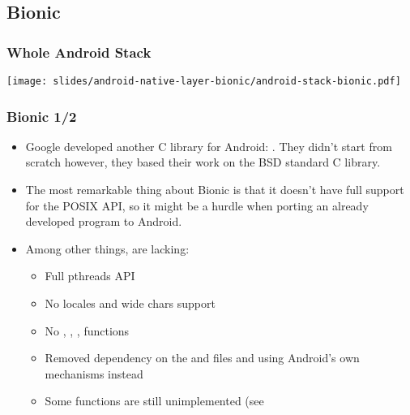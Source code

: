 \subsection{Bionic}

\begin{frame}
  \frametitle{Whole Android Stack}
  \begin{center}
    \texttt{[image: slides/android-native-layer-bionic/android-stack-bionic.pdf]}
  \end{center}
\end{frame}

\begin{frame}
  \frametitle{Bionic 1/2}
  \begin{itemize}
  \item Google developed another C library for Android:
    . They didn't start from scratch however, they
    based their work on the BSD standard C library.
  \item The most remarkable thing about Bionic is that it doesn't have
    full support for the POSIX API, so it might be a hurdle when porting an
    already developed program to Android.
  \item Among other things, are lacking:
    \begin{itemize}
    \item Full pthreads API
    \item No locales and wide chars support
    \item No , , , functions
    \item Removed dependency on the  and
       files and using Android's own mechanisms instead
    \item Some functions are still unimplemented (see
    \end{itemize}
  \end{itemize}
\end{frame}

